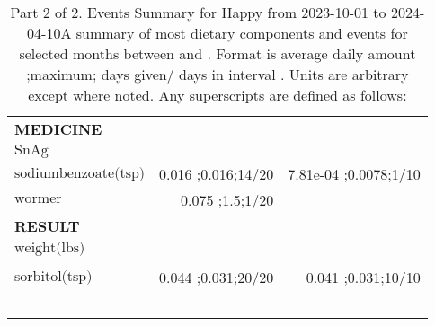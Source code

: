 \begin{table}[H]
\begin{tabular}{|l|r|r|}
{\bf MEDICINE}&&\\
$\textrm{SnAg}$&&\\
$\textrm{sodiumbenzoate(tsp)}$&0.016 ;0.016;14/20&7.81e-04 ;0.0078;1/10\\
$\textrm{wormer}$&0.075 ;1.5;1/20&\\
{\bf RESULT}&&\\
$\textrm{weight(lbs)}$&&\\
&&\\
$\textrm{sorbitol(tsp)}$&0.044 ;0.031;20/20&0.041 ;0.031;10/10\\
&&\\
&&\\
&&\\
&&\\
&&\\
\hline
\end{tabular}
\caption{Part 2 of 2.  Events Summary for Happy   from 2023-10-01 to 2024-04-10A summary of most dietary components and events  for selected months between \mjmdatemin and \mjmdatemax. Format is average daily amount ;maximum; days given/ days in interval . Units are arbitrary except where noted. Any  superscripts are defined as follows:  \mjmsuperscripts}
\end{table}
